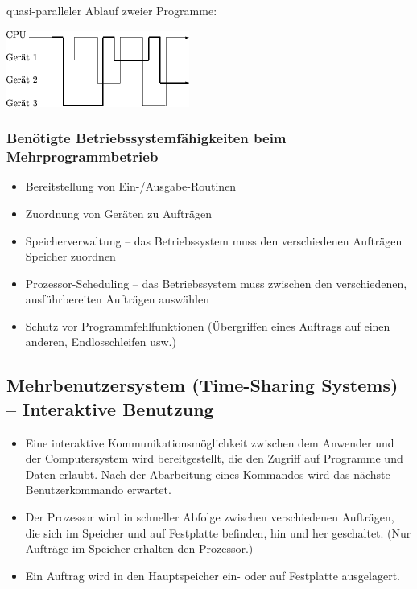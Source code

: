 \documentclass[11pt]{article}
\begin{document}
\begin{nebeneinander}
quasi-paralleler Ablauf zweier Programme:
\begin{center}
\includegraphics[width=.9\linewidth]{./Abbildungen/ZweiProgramme.png}
\end{center}
\end{nebeneinander}

\begin{clear}
\end{clear}


\subsubsection*{Benötigte Betriebssystemfähigkeiten beim Mehrprogrammbetrieb}
\label{sec:org9f633a7}
\begin{itemize}
\item Bereitstellung von Ein-/Ausgabe-Routinen
\item Zuordnung von Geräten zu   Aufträgen
\item Speicherverwaltung – das Betriebssystem muss den verschiedenen
Aufträgen Speicher zuordnen
\item Prozessor-Scheduling – das Betriebssystem muss zwischen den
verschiedenen, ausführbereiten Aufträgen auswählen
\item Schutz vor Programmfehlfunktionen (Übergriffen eines Auftrags auf
einen anderen, Endlosschleifen usw.)
\end{itemize}
\subsection*{Mehrbenutzersystem (Time-Sharing Systems) – Interaktive Benutzung}
\label{sec:org2e1055c}
\begin{itemize}
\item Eine interaktive Kommunikationsmöglichkeit zwischen dem Anwender und
der Computersystem wird bereitgestellt, die den Zugriff auf
Programme und Daten erlaubt. Nach der Abarbeitung eines Kommandos
wird das nächste Benutzerkommando erwartet.
\item Der Prozessor wird in schneller Abfolge zwischen verschiedenen
Aufträgen, die sich im Speicher und auf Festplatte befinden, hin und
her geschaltet. (Nur Aufträge im Speicher erhalten den Prozessor.)
\item Ein Auftrag wird in den Hauptspeicher ein- oder auf Festplatte
ausgelagert.
\end{itemize}
\end{document}
